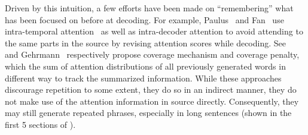 Driven by this intuition, a few efforts have been made on ``remembering''
what has been focused on before at decoding. 
For example, 
Paulus~\DIFdelbegin %
\DIFdelend \DIFaddbegin {}\DIFaddend and 
Fan~\DIFdelbegin %
\DIFdelend \DIFaddbegin {}\DIFaddend use intra-temporal 
attention~\cite{NallapatiZSGX16} as well as intra-decoder attention to avoid
attending to the same parts in the source by 
revising attention scores while decoding. 
See~\DIFdelbegin %
\DIFdelend \DIFaddbegin {}\DIFaddend and Gehrmann~\DIFdelbegin %
\DIFdelend \DIFaddbegin {}\DIFaddend respectively propose coverage mechanism and coverage penalty,
which \DIFdelbegin {}\DIFdelend \DIFaddbegin {}\DIFaddend the sum of attention distributions of all previously generated words 
in \DIFaddbegin {}\DIFaddend different way to track the summarized information.  
While these approaches discourage repetition to some extent,
they do so in an indirect manner\DIFdelbegin {}\DIFdelend \DIFaddbegin {}\DIFaddend , they do not 
make use of the attention information in source directly.
Consequently, they may still generate repeated phrases, 
especially in long sentences (shown in the first 5 sections of
).


